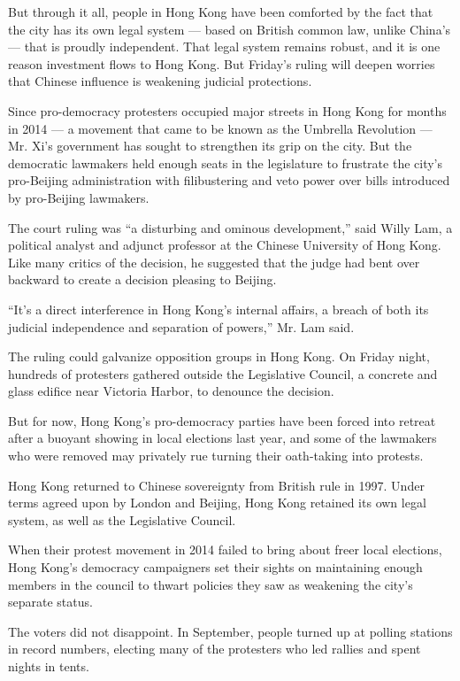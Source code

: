 But through it all, people in Hong Kong have been comforted by the fact
that the city has its own legal system --- based on British common law,
unlike China's --- that is proudly independent. That legal system
remains robust, and it is one reason investment flows to Hong Kong. But
Friday's ruling will deepen worries that Chinese influence is weakening
judicial protections.

Since pro-democracy protesters occupied major streets in Hong Kong for
months in 2014 --- a movement that came to be known as the Umbrella
Revolution --- Mr. Xi's government has sought to strengthen its grip on
the city. But the democratic lawmakers held enough seats in the
legislature to frustrate the city's pro-Beijing administration with
filibustering and veto power over bills introduced by pro-Beijing
lawmakers.

The court ruling was ``a disturbing and ominous development,'' said
Willy Lam, a political analyst and adjunct professor at the Chinese
University of Hong Kong. Like many critics of the decision, he suggested
that the judge had bent over backward to create a decision pleasing to
Beijing.

``It's a direct interference in Hong Kong's internal affairs, a breach
of both its judicial independence and separation of powers,'' Mr. Lam
said.

The ruling could galvanize opposition groups in Hong Kong. On Friday
night, hundreds of protesters gathered outside the Legislative Council,
a concrete and glass edifice near Victoria Harbor, to denounce the
decision.

But for now, Hong Kong's pro-democracy parties have been forced into
retreat after a buoyant showing in local elections last year, and some
of the lawmakers who were removed may privately rue turning their
oath-taking into protests.

Hong Kong returned to Chinese sovereignty from British rule in 1997.
Under terms agreed upon by London and Beijing, Hong Kong retained its
own legal system, as well as the Legislative Council.

When their protest movement in 2014 failed to bring about freer local
elections, Hong Kong's democracy campaigners set their sights on
maintaining enough members in the council to thwart policies they saw as
weakening the city's separate status.

The voters did not disappoint. In September, people turned up at polling
stations in record numbers, electing many of the protesters who led
rallies and spent nights in tents.

